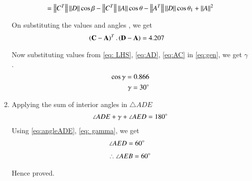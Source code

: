 \begin{enumerate}[label=\thesection.\arabic*.,ref=\thesection.\theenumi]
\begin{equation}
 = \left\lVert C^T\right\rVert\left\lVert D\right\rVert\cos\beta - \left\lVert C^T\right\rVert\left\lVert A\right\rVert\cos\theta - \left\lVert A^T\right\rVert\left\lVert D\right\rVert\cos\theta_1 + \left\lVert A\right\rVert^2
\end{equation}

On substituting the values and angles , we get
\begin{align}
\left(\mathbf{C} - \mathbf{A}\right)^T.\left(\mathbf{D} - \mathbf{A}\right) &= 4.207
\label{eq: LHS}
\end{align}

Now substituting values from \eqref{eq: LHS}, \eqref{eq:AD}, \eqref{eq:AC} in \eqref{eq:gen}, we get $\gamma$.
\begin{align}
\cos\gamma = 0.866 \\
\gamma= 30\degree
\label{eq: gamma}
\end{align}



    
\item Applying the sum of interior angles in $\triangle ADE$ 
\begin{align}
\angle ADE + \gamma + \angle AED = 180\degree
\label{eq:eq_6}
\end{align}
Using \eqref{eq:angleADE}, \eqref{eq: gamma}, we get
\begin{align}
\angle AED &= 60\degree
\end{align}
\begin{align}
\therefore \angle AEB = 60\degree 
\end{align}
    
Hence proved.
    
\end{enumerate}   
       
